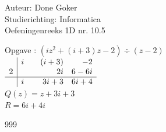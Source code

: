 \documentclass[a4paper]{article}
\begin{document}
  
\noindent \large Auteur: Done Goker \\
\noindent \large Studierichting: Informatica\\
\noindent \large Oefeningenreeks 1D nr. 10.5\\

\medskip

\normalsize


Opgave : $ (iz^2 + (i +3)z -2 )  \div (z-2) $ \\

$\begin{array}{r|rrr}
    & i & \quad (i+3) & -2   \\
    2&   & 2i & 6-6i  \\  \hline
    & i & 3i+3 & 6i+4 \\
\end{array}$\\

$ Q(z) = z + 3i + 3$\\

$R = 6i + 4i$


\begin{thebibliography}{999}
\end{thebibliography}
\end{document}
